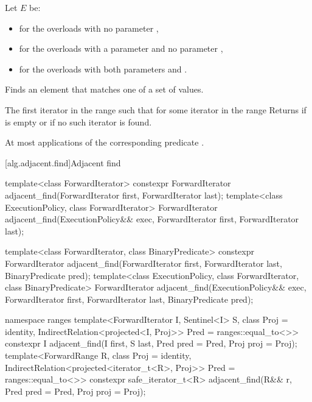 \begin{itemdescr}
\begin{addedblock}
\pnum
Let $E$ be:
\begin{itemize}
\item {} for the overloads with no parameter ,
\item {} for the overloads with a parameter  and no parameter ,
\item {} for the overloads with both parameters  and .
\end{itemize}
\end{addedblock}

\pnum
\effects
Finds an element that matches one of a set of values.

\pnum
\returns
The first iterator
in the range 
such that for some
iterator
in the range  
Returns 
if  is empty or
if no such iterator is found.

\pnum
\complexity
At most
applications of the corresponding predicate .
\end{itemdescr}

[alg.adjacent.find]{Adjacent find}

%
\begin{itemdecl}
template<class ForwardIterator>
  constexpr ForwardIterator
    adjacent_find(ForwardIterator first, ForwardIterator last);
template<class ExecutionPolicy, class ForwardIterator>
  ForwardIterator
    adjacent_find(ExecutionPolicy&& exec,
                  ForwardIterator first, ForwardIterator last);

template<class ForwardIterator, class BinaryPredicate>
  constexpr ForwardIterator
    adjacent_find(ForwardIterator first, ForwardIterator last,
                  BinaryPredicate pred);
template<class ExecutionPolicy, class ForwardIterator, class BinaryPredicate>
  ForwardIterator
    adjacent_find(ExecutionPolicy&& exec,
                  ForwardIterator first, ForwardIterator last,
                  BinaryPredicate pred);
\end{itemdecl}
\begin{addedblock}
\begin{itemdecl}
namespace ranges {
  template<ForwardIterator I, Sentinel<I> S, class Proj = identity,
      IndirectRelation<projected<I, Proj>> Pred = ranges::equal_to<>>
    constexpr I adjacent_find(I first, S last, Pred pred = Pred{},
                              Proj proj = Proj{});
  template<ForwardRange R, class Proj = identity,
      IndirectRelation<projected<iterator_t<R>, Proj>> Pred = ranges::equal_to<>>
    constexpr safe_iterator_t<R>
      adjacent_find(R&& r, Pred pred = Pred{}, Proj proj = Proj{});
}
\end{itemdecl}
\end{addedblock}

